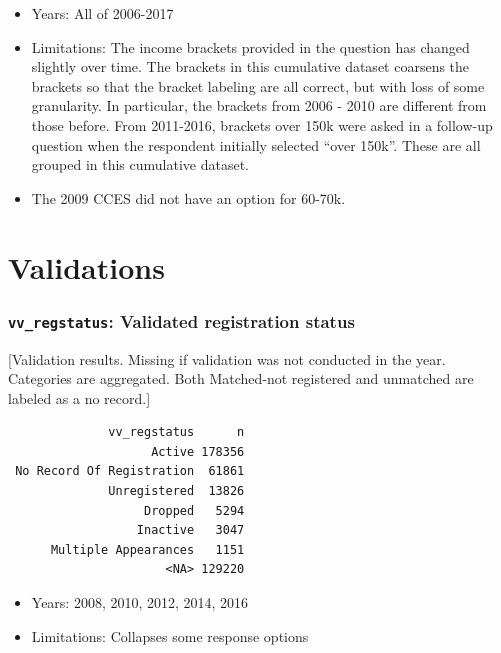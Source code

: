 \documentclass[10pt,article,oneside]{memoir}
\theoremstyle{definition}
\begin{document}
\begin{itemize}
\tightlist
\item
  Years: All of 2006-2017
\item
  Limitations: The income brackets provided in the question has changed
  slightly over time. The brackets in this cumulative dataset coarsens
  the brackets so that the bracket labeling are all correct, but with
  loss of some granularity. In particular, the brackets from 2006 - 2010
  are different from those before. From 2011-2016, brackets over 150k
  were asked in a follow-up question when the respondent initially
  selected ``over 150k''. These are all grouped in this cumulative
  dataset.
\item
  The 2009 CCES did not have an option for 60-70k.
\end{itemize}

\newpage

\hypertarget{validations}{%
\section{Validations}\label{validations}}

\hypertarget{vv_regstatus-validated-registration-status}{%
\subsubsection{\texorpdfstring{\texttt{vv\_regstatus}: Validated
registration
status}{vv\_regstatus: Validated registration status}}\label{vv_regstatus-validated-registration-status}}

{[}Validation results. Missing if validation was not conducted in the
year. Categories are aggregated. Both Matched-not registered and
unmatched are labeled as a no record.{]}

\begin{verbatim}
              vv_regstatus      n
                    Active 178356
 No Record Of Registration  61861
              Unregistered  13826
                   Dropped   5294
                  Inactive   3047
      Multiple Appearances   1151
                      <NA> 129220
\end{verbatim}

\begin{itemize}
\tightlist
\item
  Years: 2008, 2010, 2012, 2014, 2016
\item
  Limitations: Collapses some response options
\end{itemize}
\end{document}
